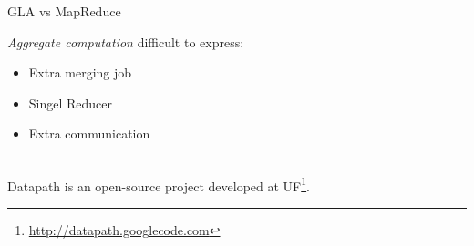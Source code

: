 \documentclass[onlymath,xcolor=pdftex,dvipsnames,table]{beamer}
\let\oldemph\emph
\renewcommand{\emph}[1]{{\color{Blue}\oldemph{#1}}}
\theoremstyle{remark} %
\begin{document}
{
\begin{frame}{GLA vs MapReduce}
\parbox{.3\paperwidth}{\scriptsize
\emph{Aggregate computation} difficult to express:
\begin{itemize}
  \item Extra merging job
  \item Singel Reducer
  \item Extra communication
\end{itemize}}\\
\vspace{3.8cm}
\footnotesize Datapath is an open-source project developed at UF\footnote{\url{http://datapath.googlecode.com}}.
\end{frame}
}
\end{document}
